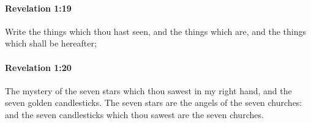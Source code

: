 		\paragraph{Revelation 1:19} %
			\label{REVELATIONNT-1-19}

			Write the things which thou hast seen, and the things which are, and the things which shall be hereafter;

			\begin{framed}
			\scriptsize
				\begin{compactdesc}
					\item[SBLG] 
				\end{compactdesc}
			\end{framed}

		\paragraph{Revelation 1:20} %
			\label{REVELATIONNT-1-20}

			The mystery of the seven stars which thou sawest in my right hand, and the seven golden candlesticks. The seven stars are the angels of the seven churches: and the seven candlesticks which thou sawest are the seven churches.

